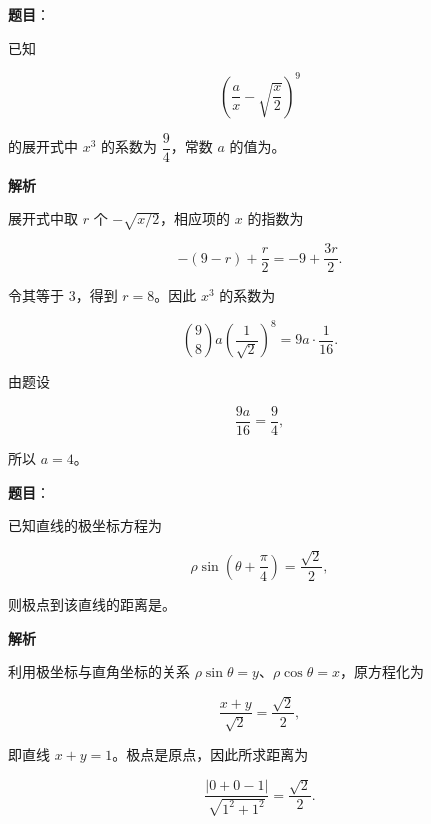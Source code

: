 \begin{answer}

\textbf{题目}：

已知

\nopagebreak[4]
\[
\left(\dfrac ax-\sqrt{\dfrac x2}\right)^9
\]

的展开式中 $x^3$ 的系数为 $\dfrac94$，常数 $a$ 的值为\gkblank{}。

\textbf{解析}

展开式中取 $r$ 个 $-\sqrt{x/2}$，相应项的 $x$ 的指数为

\nopagebreak[4]
\[
-(9-r)+\frac r2=-9+\frac{3r}{2}.
\]

令其等于 $3$，得到 $r=8$。因此 $x^3$ 的系数为

\nopagebreak[4]
\[
\binom98a\left(\frac1{\sqrt2}\right)^8
=9a\cdot\frac1{16}.
\]

由题设

\nopagebreak[4]
\[
\frac{9a}{16}=\frac94,
\]

所以 $a=4$。


\end{answer}
\begin{answer}

\textbf{题目}：

已知直线的极坐标方程为

\nopagebreak[4]
\[
\rho\sin\left(\theta+\dfrac\pi4\right)=\dfrac{\sqrt2}{2},
\]

则极点到该直线的距离是\gkblank{}。

\textbf{解析}

利用极坐标与直角坐标的关系 $\rho\sin\theta=y$、$\rho\cos\theta=x$，原方程化为

\nopagebreak[4]
\[
\frac{x+y}{\sqrt2}=\frac{\sqrt2}{2},
\]

即直线 $x+y=1$。极点是原点，因此所求距离为

\nopagebreak[4]
\[
\frac{|0+0-1|}{\sqrt{1^2+1^2}}=\frac{\sqrt2}{2}.
\]


\end{answer}
